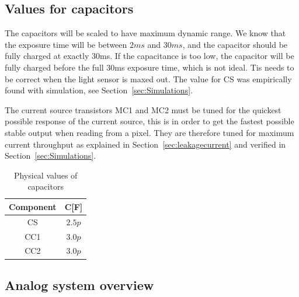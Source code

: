 \subsection{Values for capacitors}

The capacitors will be scaled to have maximum dynamic range. We know that the exposure time  will be between $2ms$ and $30ms$, and the capacitor should be fully charged at exactly 30ms. If the capacitance is too low, the capacitor will be fully charged before the full 30ms exposure time, which is not ideal. Tis needs to be correct when the light sensor is maxed out. The value for CS was empirically found with simulation, see Section~\ref{sec:Simulations}.

The current source transistors MC1 and MC2 must be tuned for the quickest possible response of the current source, this is in order to get the fastest possible stable output when reading from a pixel.
They are therefore tuned for maximum current throughput as explained in Section~\ref{sec:leakagecurrent} and verified in Section~\ref{sec:Simulations}.

\begin{table}[htbp]
  \centering
  \caption{Physical values of capacitors}
  \begin{tabular}{c | c}
    Component & C[F] \\
    \midrule
    CS & $2.5p$ \\
    CC1 & $3.0p$ \\
    CC2 & $3.0p$
  \end{tabular} \label{tab:capcomponentvalues}
\end{table}

\subsection{Analog system overview}


